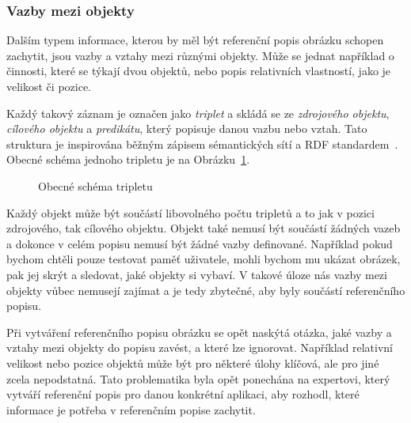 \subsubsection{Vazby mezi objekty}
Dalším typem informace, kterou by měl být referenční popis obrázku schopen zachytit, jsou vazby a vztahy mezi různými objekty.
Může se jednat například o činnosti, které se týkají dvou objektů, nebo popis relativních vlastností, jako je velikost či pozice.

Každý takový záznam je označen jako \emph{triplet} a skládá se ze \emph{zdrojového objektu},
\emph{cílového objektu} a \emph{predikátu}, který popisuje danou vazbu nebo vztah.
Tato struktura je inspirována běžným zápisem sémantických sítí a RDF standardem~\cite{rdf}.
Obecné schéma jednoho tripletu je na Obrázku~\ref{fig:schema_tripletu}.

\begin{figure}[H]
	\centering
	\caption{Obecné schéma tripletu}\label{fig:schema_tripletu}
\end{figure}

Každý objekt může být součástí libovolného počtu tripletů a to jak v pozici zdrojového, tak cílového objektu.
Objekt také nemusí být součástí žádných vazeb a dokonce v celém popisu nemusí být žádné vazby definované.
Například pokud bychom chtěli pouze testovat paměť uživatele, mohli bychom mu ukázat obrázek, pak jej skrýt a sledovat, jaké objekty si vybaví.
V takové úloze nás vazby mezi objekty vůbec nemusejí zajímat a je tedy zbytečné, aby byly součástí referenčního popisu.

Při vytváření referenčního popisu obrázku se opět naskýtá otázka, jaké vazby a vztahy mezi objekty do popisu zavést, a které lze ignorovat.
Například relativní velikost nebo pozice objektů může být pro některé úlohy klíčová, ale pro jiné zcela nepodstatná.
Tato problematika byla opět ponechána na expertovi, který vytváří referenční popis pro danou konkrétní aplikaci,
aby rozhodl, které informace je potřeba v referenčním popise zachytit.

